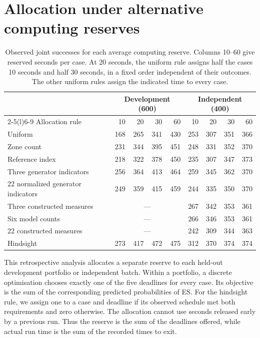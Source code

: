 \documentclass[11pt,a4paper]{article}
\newcommand{\tablefont}{\small\renewcommand{\arraystretch}{1.14}}
\begin{document}
\section{Allocation under alternative computing reserves}
\label{app:reserve}

\begin{table}[htbp]\centering\tablefont
\caption{Observed joint successes for each average computing reserve. Columns 10--60 give reserved seconds per case. At 20 seconds, the uniform rule assigns half the cases 10 seconds and half 30 seconds, in a fixed order independent of their outcomes. The other uniform rules assign the indicated time to every case.}
\label{tab:allreserves}
\begin{tabular}{@{}lrrrr rrrr@{}}\toprule
 & \multicolumn{4}{c}{Development (600)} & \multicolumn{4}{c}{Independent (400)}\\
\cmidrule(lr){2-5}\cmidrule(l){6-9}
Allocation rule & 10 & 20 & 30 & 60 & 10 & 20 & 30 & 60\\\midrule
Uniform & 168 & 265 & 341 & 430 & 253 & 307 & 351 & 366\\
Zone count & 231 & 344 & 395 & 451 & 248 & 331 & 352 & 370\\
Reference index & 218 & 322 & 378 & 450 & 235 & 307 & 347 & 373\\
Three generator indicators & 256 & 364 & 413 & 464 & 259 & 345 & 362 & 370\\
22 normalized generator indicators & 249 & 359 & 415 & 459 & 244 & 335 & 350 & 370\\
Three constructed measures & \multicolumn{4}{c}{---} & 267 & 342 & 353 & 361\\
Six model counts & \multicolumn{4}{c}{---} & 266 & 346 & 353 & 361\\
22 constructed measures & \multicolumn{4}{c}{---} & 242 & 309 & 344 & 363\\
Hindsight & 273 & 417 & 472 & 475 & 312 & 370 & 374 & 374\\
\bottomrule\end{tabular}
\end{table}

This retrospective analysis allocates a separate reserve to each held-out development portfolio or independent batch. Within a portfolio, a discrete optimisation chooses exactly one of the five deadlines for every case. Its objective is the sum of the corresponding predicted probabilities of ES. For the hindsight rule, we assign one to a case and deadline if its observed schedule met both requirements and zero otherwise. The allocation cannot use seconds released early by a previous run. Thus the reserve is the sum of the deadlines offered, while actual run time is the sum of the recorded times to exit.
\end{document}
